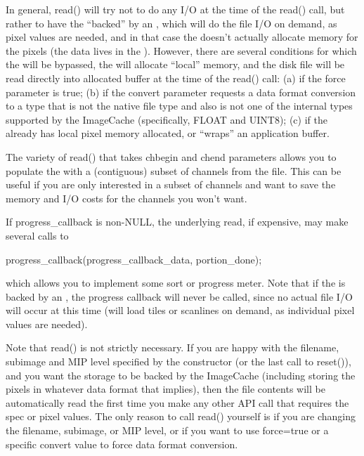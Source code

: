 In general, {\cf read()} will try not to do any I/O at the time of the
{\cf read()} call, but rather to have the \ImageBuf ``backed'' by an
\ImageCache, which will do the file I/O on demand, as pixel values are
needed, and in that case the \ImageBuf doesn't actually allocate memory
for the pixels (the data lives in the \ImageCache).  However, there are
several conditions for which the \ImageCache will be bypassed, the
\ImageBuf will allocate ``local'' memory, and the disk file will be read
directly into allocated buffer at the time of the {\cf read()} call:
(a) if the {\cf force} parameter is {\cf true}; (b) if the {\cf convert}
parameter requests a data format conversion to a type that is not the
native file type and also is not one of the internal types supported by
the {\cf ImageCache} (specifically, {\cf FLOAT} and {\cf UINT8});
(c) if the \ImageBuf already has local pixel memory allocated, or
``wraps'' an application buffer.

The variety of {\cf read()} that takes {\cf chbegin} and {\cf chend}
parameters allows you to populate the \ImageBuf with a (contiguous) subset
of channels from the file. This can be useful if you are only interested
in a subset of channels and want to save the memory and I/O costs for the
channels you won't want.

If {\cf progress_callback} is non-NULL, the underlying read, if
expensive, may make several calls to
\begin{code}
  progress_callback(progress_callback_data, portion_done);
\end{code}
\noindent which allows you to implement some sort or progress meter.
Note that if the \ImageBuf is backed by an \ImageCache, the
progress callback will never be called, since no actual file I/O
will occur at this time (\ImageCache will load tiles or scanlines
on demand, as individual pixel values are needed).

Note that {\cf read()} is not strictly necessary. If you are happy with
the filename, subimage and MIP level specified by the \ImageBuf constructor
(or the last call to {\cf reset()}), and you want the storage to be backed
by the {\cf ImageCache} (including storing the pixels in whatever data
format that implies), then the file contents will be automatically read
the first time you make any other \ImageBuf API call that requires the
spec or pixel values.  The only reason to call {\cf read()} yourself is
if you are changing the filename, subimage, or MIP level, or if you want
to use {\cf force=true} or a specific {\cf convert} value to force data
format conversion.
\apiend


